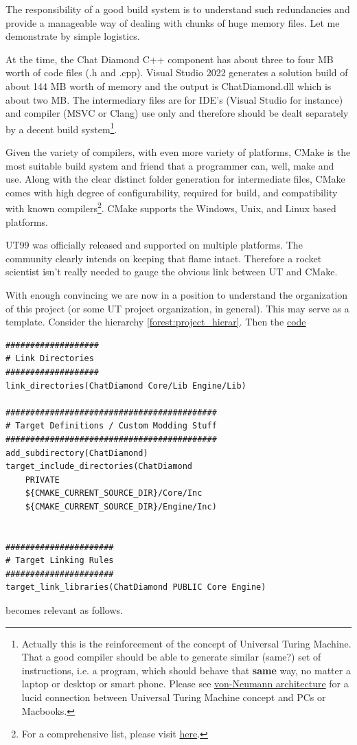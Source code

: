 \documentclass{article}
\theoremstyle{definition}
\newenvironment{dummy}{}{}
\newcommand{\FileColor}[1]{{\color{Purple} #1}}
\begin{document}
The responsibility of a good build system is to understand such redundancies and provide a manageable way of dealing with chunks of huge memory files.
Let me demonstrate by simple logistics.  

At the time, the Chat Diamond C++ component has about three to four MB worth of code files (.h and .cpp).  
Visual Studio 2022 generates a solution build of about 144 MB worth of memory and the output is \FileColor{ChatDiamond.dll} which is about two MB.  The intermediary files are 
for IDE's (Visual Studio for instance) and compiler (MSVC or Clang) use only and therefore should be dealt separately by a decent build system\footnote{Actually this is the
reinforcement of the concept of Universal Turing Machine.  That a good compiler should be able to generate similar (same?) set of instructions, i.e. a program, 
which should behave that \textbf{same} way, no matter a laptop or desktop or smart phone.  Please see \href{https://en.wikipedia.org/wiki/Von_Neumann_architecture}{von-Neumann architecture} for a lucid connection 
between Universal Turing Machine concept and PCs or Macbooks.}.

Given the variety of compilers, with even more variety of platforms, CMake is the most suitable build system and friend that a programmer can, well, make and use.  Along with the clear 
distinct folder generation for intermediate files, CMake comes with high degree of configurability, required for build, and compatibility with known compilers\footnote{For a comprehensive list, please visit \href{https://cmake.org/cmake/help/latest/manual/cmake-compile-features.7.html}{here}.}.  
CMake supports the Windows, Unix, and Linux based platforms.

UT99 was officially released and supported on multiple platforms.  The community clearly intends on keeping that flame intact.  Therefore a rocket scientist isn't really needed to gauge the obvious link 
between UT and CMake.

With enough convincing we are now in a position to understand the organization of this project (or some UT project organization, in general).  This may serve as a template.  
Consider the hierarchy \ref{forest:project_hierar}.  Then the \href{https://github.com/ravimohan1991/ChatDiamond/blob/f7950b2591b93a54600459ec58d7ddf57fe9218d/UTNativeEssentials/CMakeLists.txt#L201-L216}{code}

\lstset{language=[5.0]Lua}
\begin{dummy}
\begin{lstlisting}[frame=single]
###################
# Link Directories
###################
link_directories(ChatDiamond Core/Lib Engine/Lib)

###########################################
# Target Definitions / Custom Modding Stuff
###########################################
add_subdirectory(ChatDiamond)
target_include_directories(ChatDiamond
    PRIVATE
    ${CMAKE_CURRENT_SOURCE_DIR}/Core/Inc
    ${CMAKE_CURRENT_SOURCE_DIR}/Engine/Inc)


######################
# Target Linking Rules
######################
target_link_libraries(ChatDiamond PUBLIC Core Engine)
\end{lstlisting}
\end{dummy}
becomes relevant as follows.
\end{document}

